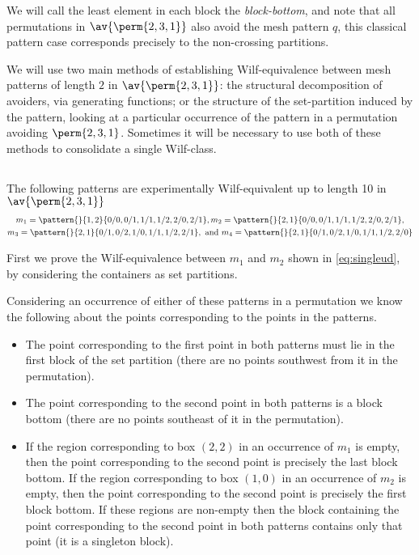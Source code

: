 We will call the least element in each block the \emph{block-bottom}, and note that all permutations
in \(\av{\perm{2,3,1}}\) also avoid the mesh pattern \(q\), this classical pattern case
corresponds precisely to the non-crossing partitions.

We will use two main methods of establishing Wilf-equivalence between mesh patterns of length \(2\)
in \(\av{\perm{2,3,1}}\): the structural decomposition of avoiders, via generating functions; or the
structure of the set-partition induced by the pattern, looking at a particular occurrence of the
pattern in a permutation avoiding \(\perm{2,3,1}\). Sometimes it will be necessary to use both of
these methods to consolidate a single Wilf-class.

\subsection{}
\nextvar
The following patterns are experimentally Wilf-equivalent up to length 10 in
\(\av{\perm{2,3,1}}\)
\begin{gather}
    m_1 = \pattern{}{1,2}{0/0,0/1,1/1,1/2,2/0,2/1},
    m_2 = \pattern{}{2,1}{0/0,0/1,1/1,1/2,2/0,2/1}, \label{eq:singleud}\\
    m_3 = \pattern{}{2,1}{0/1,0/2,1/0,1/1,1/2,2/1}, \text{ and }
    m_4 = \pattern{}{2,1}{0/1,0/2,1/0,1/1,1/2,2/0} \label{eq:other}
\end{gather}

First we prove the Wilf-equivalence between \(m_1\) and \(m_2\) shown in
\eqref{eq:singleud}, by considering the containers as set partitions.

Considering an occurrence of either of these patterns in a permutation  we know
the following about the points corresponding to the points in the patterns.
\begin{itemize}
    \item The point corresponding to the first point in both patterns
        must lie in the first block of the set partition (there are
        no points southwest from it in the permutation).
    \item The point corresponding to the second point in both patterns
        is a block bottom (there are no points southeast of it in
        the permutation).
    \item If the region corresponding to box \((2,2)\) in an occurrence of
    \(m_1\) is empty, then the point corresponding to the second point is
    precisely the last block bottom. If the region corresponding to box \((1,0)\)
    in an occurrence of \(m_2\) is empty, then the point corresponding to the
    second point is precisely the first block bottom.
    If these regions are non-empty then the block containing the point
    corresponding to the second point in both patterns contains only that point
    (it is a singleton block).
\end{itemize}

